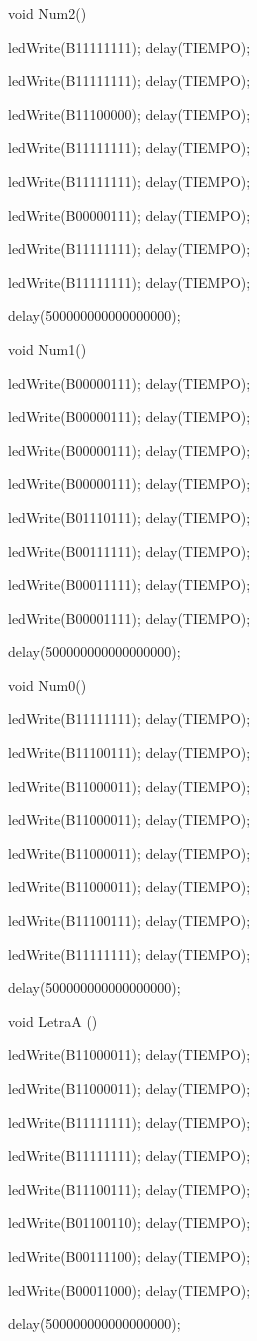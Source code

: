 \documentclass{article}
\begin{document}
void Num2(){
     
   ledWrite(B11111111); delay(TIEMPO);
   
   ledWrite(B11111111); delay(TIEMPO);
   
   ledWrite(B11100000); delay(TIEMPO);
   
   ledWrite(B11111111); delay(TIEMPO);
   
   ledWrite(B11111111); delay(TIEMPO);
   
   ledWrite(B00000111); delay(TIEMPO);
   
   ledWrite(B11111111); delay(TIEMPO);
   
   ledWrite(B11111111); delay(TIEMPO);
  
  delay(500000000000000000);}

void Num1(){ 
   
   ledWrite(B00000111); delay(TIEMPO);
   
   ledWrite(B00000111); delay(TIEMPO);
   
   ledWrite(B00000111); delay(TIEMPO);
   
   ledWrite(B00000111); delay(TIEMPO);
   
   ledWrite(B01110111); delay(TIEMPO);
   
   ledWrite(B00111111); delay(TIEMPO);
   
   ledWrite(B00011111); delay(TIEMPO);
   
   ledWrite(B00001111); delay(TIEMPO);
  
  delay(500000000000000000);}

void Num0(){
   
   ledWrite(B11111111); delay(TIEMPO);
   
   ledWrite(B11100111); delay(TIEMPO);
   
   ledWrite(B11000011); delay(TIEMPO);
   
   ledWrite(B11000011); delay(TIEMPO);
   
   ledWrite(B11000011); delay(TIEMPO);
   
   ledWrite(B11000011); delay(TIEMPO);
   
   ledWrite(B11100111); delay(TIEMPO);
   
   ledWrite(B11111111); delay(TIEMPO);
  
  delay(500000000000000000);}
  
void LetraA (){
   
   ledWrite(B11000011); delay(TIEMPO);
   
   ledWrite(B11000011); delay(TIEMPO);
   
   ledWrite(B11111111); delay(TIEMPO);
   
   ledWrite(B11111111); delay(TIEMPO);
   
   ledWrite(B11100111); delay(TIEMPO);
   
   ledWrite(B01100110); delay(TIEMPO);
   
   ledWrite(B00111100); delay(TIEMPO);
   
   ledWrite(B00011000); delay(TIEMPO);
  
  delay(500000000000000000);}
\end{document}
